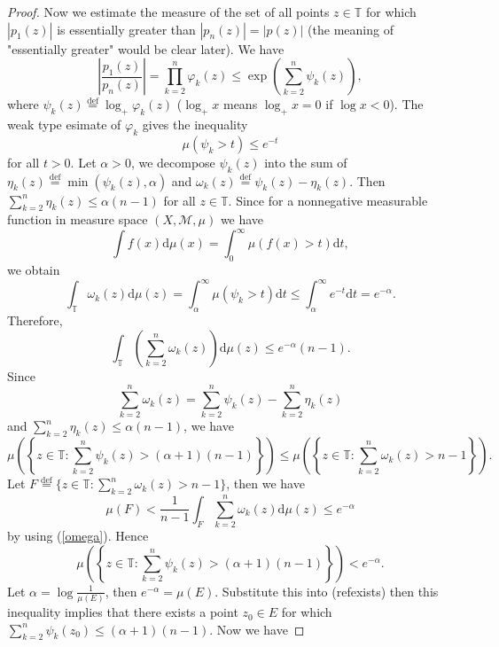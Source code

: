 \begin{proof}
Now we estimate the measure of the set of all points $z\in \mathbb{T}$ for which $\left| p_1(z) \right| $ is essentially greater than $\left| p_n(z) \right| =\left| p(z) \right| $ (the meaning of "essentially greater" would be clear later). We have
\[
  \left| \frac{p_1(z)}{p_n(z)} \right| = \prod_{k=2}^{n}\varphi_k(z)\le \exp\left( \sum_{k=2}^{n}\psi_k(z) \right), 
\] 
where $\psi_k(z) \overset{\mathrm{def}}{=}\log_{+}\varphi_k(z)$ ($\log_{+}x$ means $\log_{+} x=0$ if $\log x <0$). The weak type esimate of $\varphi_k$ gives the inequality 
\[
  \mu \left( \psi_k>t \right)  \le e^{-t}
\] for all $t>0$.
Let $\alpha >0$, we decompose  $\psi_k(z)$ into the sum of $\eta_k(z)\overset{\mathrm{def}}{=}\min\left( \psi_k(z),\alpha \right) $ and $\omega_k(z)\overset{\mathrm{def}}{=}\psi_k(z)-\eta_k(z)$.
Then $\sum_{k=2}^{n}\eta_k(z)\le \alpha(n-1)$ for all $z\in \mathbb{T}$. Since for a nonnegative measurable function in measure space $ \left( X,\mathcal{M},\mu \right) $ we have $$\int f(x)\mathrm{d}\mu(x)=\int_0^{\infty}\mu(f(x)>t)\mathrm{d}t,$$ we obtain 
\[
  \int_{\mathbb{T}}\omega_k(z)\mathrm{d}\mu(z)=\int_{\alpha}^{\infty}\mu(\psi_k>t)\mathrm{d}t\le \int_{\alpha}^{\infty}e^{-t}\mathrm{d}t=e^{-\alpha}.
\] 
Therefore,
\begin{equation}
  \int_{\mathbb{T}}\left( \sum_{k=2}^{n} \omega_k(z) \right) \mathrm{d}\mu(z)\le e^{-\alpha}(n-1)\label{omega}.
\end{equation}
Since 
\[
  \sum_{k=2}^{n} \omega_k(z)=\sum_{k=2}^{n} \psi_k(z)-\sum_{k=2}^{n} \eta_k(z)
\]
and $\sum_{k=2}^{n} \eta_k(z)\le \alpha(n-1)$, we have
\begin{equation*}
    \mu\left( \left\{z\in \mathbb{T}:\sum_{k=2}^{n}\psi_k(z)>(\alpha+1)(n-1)\right\} \right) \le \mu\left( \left\{z\in \mathbb{T}: \sum_{k=2}^{n} \omega_{k}(z)>n-1\right\} \right). 
\end{equation*} 
Let $F\overset{\mathrm{def}}{=} \{z\in \mathbb{T}: \sum_{k=2}^{n} \omega_k(z)>n-1\} $, then we have
\[
  \mu\left( F \right) < \frac{1}{n-1}\int_{F}\sum_{k=2}^{n} \omega_k(z)\mathrm{d}\mu(z)\le e^{-\alpha}
\] 
by using (\ref{omega}). Hence
\begin{equation}
  \mu\left( \left\{z\in \mathbb{T}:\sum_{k=2}^{n} \psi_k(z)>(\alpha+1)(n-1)\right\}  \right) <e^{-\alpha}.\label{exists}
\end{equation}
Let $\alpha = \log \frac{1}{\mu(E)}$, then $e^{-\alpha}=\mu(E)$. Substitute this into (ref{exists}) then this inequality implies that there exists a point $z_0\in E$ for which $\sum_{k=2}^{n} \psi_k(z_0)\le \left( \alpha+1 \right) (n-1)$. Now we have

\end{proof}
